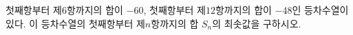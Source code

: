 첫째항부터 제$6$항까지의 합이 $-60$, 첫째항부터 제$12$항까지의 합이 $-48$인 등차수열이 있다. 이 등차수열의 첫째항부터 제$n$항까지의 합 $S_n$의 최솟값을 구하시오.
